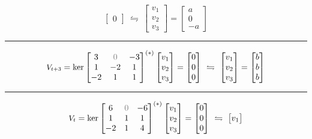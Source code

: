 {{\[\begin{bmatrix}
0
\end{bmatrix} \ \leftrightharpoons \ \begin{bmatrix}
v_1 \\ 
v_2 \\ 
v_3
\end{bmatrix} = \begin{bmatrix}
a \\ 
0 \\ 
-a
\end{bmatrix}\]}
\hrule 
{\footnotesize \vspace{0.2cm}\[\text{\small $V_{t+3}$} = \ker \begin{bmatrix}
3 & \textcolor{gray}{0} & -3 \\
1 & -2 & 1 \\
-2 & 1 & 1 
\end{bmatrix}^{(*)} \begin{bmatrix}
v_1 \\ 
v_2 \\ 
v_3
\end{bmatrix} = \begin{bmatrix}
0 \\
0 \\
0
\end{bmatrix} \ \leftrightharpoons \ \begin{bmatrix}
v_1 \\ 
v_2 \\ 
v_3
\end{bmatrix} = \begin{bmatrix}
b \\ 
b \\ 
b
\end{bmatrix}\]
}
\hrule 
{\footnotesize \vspace{0.2cm}\[\text{\small $V_{t}$} = \ker \begin{bmatrix}
6 & \textcolor{gray}{0} & -6 \\
1 & 1 & 1 \\
-2 & 1 & 4 
\end{bmatrix}^{(*)} \begin{bmatrix}
v_1 \\ 
v_2 \\ 
v_3
\end{bmatrix} = \begin{bmatrix}
0 \\
0 \\
0
\end{bmatrix} \ \leftrightharpoons \ \begin{bmatrix}
v_1 \\ 

\end{bmatrix}\]}}
